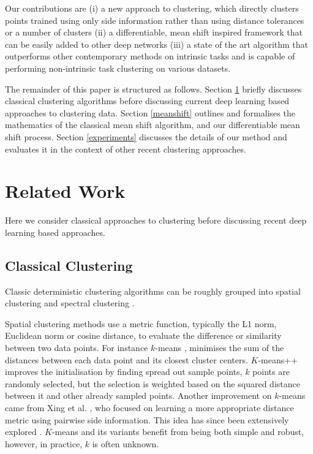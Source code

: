 \documentclass[letterpaper, 11pt]{IEEEtran}
\begin{document}
Our contributions are (i) a new approach to clustering, which directly clusters points trained using only side information rather than using distance tolerances or a number of clusters (ii) a differentiable, mean shift inspired framework that can be easily added to other deep networks (iii) a state of the art algorithm that outperforms other contemporary methods on intrinsic tasks and is capable of performing non-intrinsic task clustering on various datasets.

The remainder of this paper is structured as follows. Section \ref{relatedwork} briefly discusses classical clustering algorithms before discussing current deep learning based approaches to clustering data.
Section \ref{meanshift} outlines and formalises the mathematics of the classical mean shift algorithm, and our differentiable mean shift process. Section \ref{experiments} discusses the details of our method and evaluates it in the context of other recent clustering  approaches.

\section{Related Work}\label{relatedwork}
Here we consider classical approaches to clustering before discussing recent deep learning based approaches.

\subsection{Classical Clustering}
Classic deterministic clustering algorithms can be roughly grouped into spatial clustering \cite{Lloyd1982,Sander1998} and spectral clustering \cite{VonLuxburg2007}. 

Spatial clustering methods use a metric function, typically the L1 norm, Euclidean norm or cosine distance, to evaluate the difference or similarity between two data points.
For instance $k$-means \cite{Lloyd1982}, minimises the sum of the distances between each data point and its closest cluster centers. $K$-means++ \cite{Arthur2007} improves the initialisation by finding spread out sample points, $k$ points are randomly selected, but the selection is weighted based on the squared distance between it and other already sampled points. Another improvement on $k$-means came from Xing et al. \cite{Xing}, who focused on learning a more appropriate distance metric using pairwise side information. This idea has since been extensively explored \cite{Ceccarelli2008,ailon2018approximate,choudhury2019top,kim2017relaxed,mazumdar2017clustering}.
$K$-means and its variants benefit from being both simple and robust, however, in practice, $k$ is often unknown. 
\end{document}
